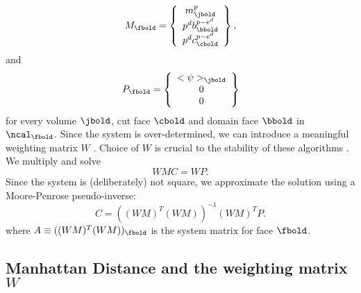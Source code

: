 \documentclass{article}
\begin{document}
{\begin{equation}
  M_\fbold =\left\{
    \begin{array}{c} 
       m^p_\jbold  \\
       p^d b^{p-e^d}_\bbold  \\
       p^d c^{p-e^d}_\cbold  
    \end{array}
 \right\},
\end{equation}
and
\begin{equation}
  P_\fbold =
    \left\{
    \begin{array}{c} 
       <\psi>_\jbold  \\
      0  \\
      0  
    \end{array}
    \right\}
\end{equation}
for every volume $\jbold$, cut face $\cbold$ and domain face $\bbold$
in $\ncal_\fbold$.
Since the system is over-determined, we can introduce a 
meaningful weighting matrix $W$ \footnotemark[4]. 
 Choice of $W$
is crucial to the stability of these algorithms
\footnotemark[5].   
We multiply and solve
\begin{equation*}
WMC = WP.
\end{equation*}
Since the system is (deliberately) not square, we approximate
the solution using a Moore-Penrose pseudo-inverse:
\begin{equation}
  C = ((WM)^T(WM))^{-1} (WM)^T P.
\label{eqn::getC}  
\end{equation}
where $A \equiv ((WM)^T(WM))_\fbold$ is the system matrix for face
$\fbold$.

\subsection{Manhattan Distance and the weighting matrix $W$}

}
\end{document}
